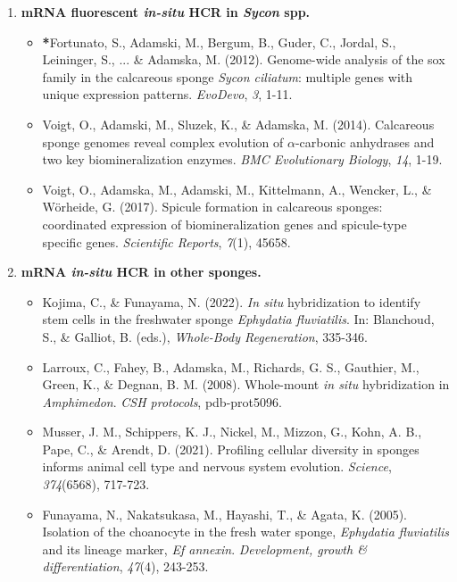 \documentclass[10pt]{report}
\begin{document}
\begin{enumerate}
	\item \textbf{mRNA fluorescent \textit{in-situ} HCR in \textit{Sycon} spp.}
		\begin{itemize}
			\item \textbf{*}Fortunato, S., Adamski, M., Bergum, B., Guder, C., Jordal, S., Leininger, S., ... \& Adamska, M. (2012). Genome-wide analysis of the sox family in the calcareous sponge \textit{Sycon ciliatum}: multiple genes with unique expression patterns. \textit{EvoDevo}, \textit{3}, 1-11. 
			\item Voigt, O., Adamski, M., Sluzek, K., \& Adamska, M. (2014). Calcareous sponge genomes reveal complex evolution of $\alpha$-carbonic anhydrases and two key biomineralization enzymes. \textit{BMC Evolutionary Biology}, \textit{14}, 1-19. \\ 
			\item Voigt, O., Adamska, M., Adamski, M., Kittelmann, A., Wencker, L., \& W{\"o}rheide, G. (2017). Spicule formation in calcareous sponges: coordinated expression of biomineralization genes and spicule-type specific genes. \textit{Scientific Reports}, \textit{7}(1), 45658. 
		\end{itemize}
	\item \textbf{mRNA \textit{in-situ} HCR in other sponges.}
		\begin{itemize}
			\item Kojima, C., \& Funayama, N. (2022). \textit{In situ} hybridization to identify stem cells in the freshwater sponge \textit{Ephydatia fluviatilis}. In: Blanchoud, S., \& Galliot, B. (eds.), \textit{Whole-Body Regeneration}, 335-346. \\ 
			\item Larroux, C., Fahey, B., Adamska, M., Richards, G. S., Gauthier, M., Green, K., \& Degnan, B. M. (2008). Whole-mount \textit{in situ} hybridization in \textit{Amphimedon}. \textit{CSH protocols}, pdb-prot5096. 
			\item Musser, J. M., Schippers, K. J., Nickel, M., Mizzon, G., Kohn, A. B., Pape, C., \& Arendt, D. (2021). Profiling cellular diversity in sponges informs animal cell type and nervous system evolution. \textit{Science}, \textit{374}(6568), 717-723. 
			\item Funayama, N., Nakatsukasa, M., Hayashi, T., \& Agata, K. (2005). Isolation of the choanocyte in the fresh water sponge, \textit{Ephydatia fluviatilis} and its lineage marker, \textit{Ef annexin}. \textit{Development, growth \& differentiation}, \textit{47}(4), 243-253. 
		\end{itemize}
\end{enumerate}

\clearpage
\end{document}
